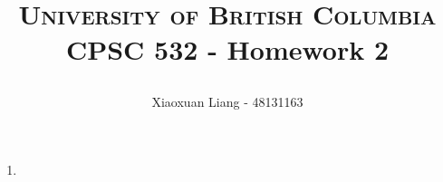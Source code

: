 \documentclass{article}
\title{ \normalfont \normalsize 

\textsc{University of British Columbia}
\horrule{0.9pt} \\[0.6cm]
\huge CPSC 532 - Homework 2}
\date{}
\author{Xiaoxuan Liang - 48131163}
\begin{document}
\maketitle

\begin{enumerate}
\item
\end{enumerate}
\end{document}
